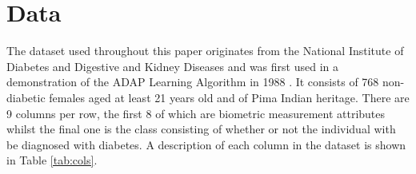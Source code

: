 \section{Data}
\label{sec:data}


The dataset used throughout this paper originates from the National Institute of Diabetes and Digestive and Kidney Diseases and was first used in a demonstration of the ADAP Learning Algorithm in 1988 \cite{pima}. It consists of 768 non-diabetic females aged at least 21 years old and of Pima Indian heritage. There are 9 columns per row, the first 8 of which are biometric measurement attributes whilst the final one is the class consisting of whether or not the individual with be diagnosed with diabetes. A description of each column in the dataset is shown in Table \ref{tab:cols}.

